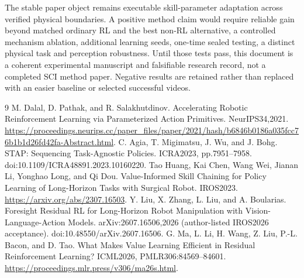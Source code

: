 \documentclass[10pt]{article}
\begin{document}
The stable paper object remains executable skill-parameter adaptation across verified physical boundaries. A positive method claim would require reliable gain beyond matched ordinary RL and the best non-RL alternative, a controlled mechanism ablation, additional learning seeds, one-time sealed testing, a distinct physical task and perception robustness. Until those tests pass, this document is a coherent experimental manuscript and falsifiable research record, not a completed SCI method paper. Negative results are retained rather than replaced with an easier baseline or selected successful videos.
\begin{thebibliography}{9}
 M. Dalal, D. Pathak, and R. Salakhutdinov. Accelerating Robotic Reinforcement Learning via Parameterized Action Primitives. NeurIPS34,2021. \url{https://proceedings.neurips.cc/paper_files/paper/2021/hash/b6846b0186a035fcc76b1b1d26fd42fa-Abstract.html}.
 C. Agia, T. Migimatsu, J. Wu, and J. Bohg. STAP: Sequencing Task-Agnostic Policies. ICRA2023, pp.7951--7958. doi:10.1109/ICRA48891.2023.10160220.
 Tao Huang, Kai Chen, Wang Wei, Jianan Li, Yonghao Long, and Qi Dou. Value-Informed Skill Chaining for Policy Learning of Long-Horizon Tasks with Surgical Robot. IROS2023. \url{https://arxiv.org/abs/2307.16503}.
 Y. Liu, X. Zhang, L. Liu, and A. Boularias. Foresight Residual RL for Long-Horizon Robot Manipulation with Vision-Language-Action Models. arXiv:2607.16506,2026 (author-listed IROS2026 acceptance). doi:10.48550/arXiv.2607.16506.
 G. Ma, L. Li, H. Wang, Z. Liu, P.-L. Bacon, and D. Tao. What Makes Value Learning Efficient in Residual Reinforcement Learning? ICML2026, PMLR306:84569--84601. \url{https://proceedings.mlr.press/v306/ma26s.html}.
\end{thebibliography}
\end{document}
